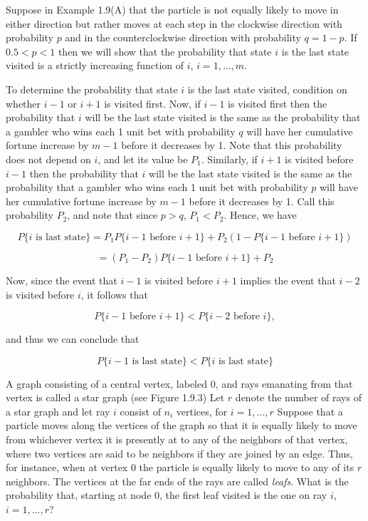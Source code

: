 \documentclass[lang=cn,10pt,thmcnt=section]{elegantbook}
\begin{document}
\begin{example}
	Suppose in Example 1.9(A) that the particle is not equally likely to move in either direction but rather moves at each step in the clockwise direction with probability $p$ and in the counterclockwise direction with probability $q = 1 - p$. If $0.5 < p < 1$ then we will show that the probability that state $i$ is the last state visited is a strictly increasing function of $i$, $i = 1, \ldots, m$.

To determine the probability that state $i$ is the last state visited, condition on whether $i - 1$ or $i + 1$ is visited first. Now, if $i - 1$ is visited first then the probability that $i$ will be the last state visited is the same as the probability that a gambler who wins each 1 unit bet with probability $q$ will have her cumulative fortune increase by $m - 1$ before it decreases by 1. Note that this probability does not depend on $i$, and let its value be $P_1$. Similarly, if $i + 1$ is visited before $i - 1$ then the probability that $i$ will be the last state visited is the same as the probability that a gambler who wins each 1 unit bet with probability $p$ will have her cumulative fortune increase by $m - 1$ before it decreases by 1. Call this probability $P_2$, and note that since $p > q$, $P_1 < P_2$. Hence, we have

\[
P\{i \text{ is last state}\} = P_1 P\{i - 1 \text{ before } i + 1\} + P_2 (1 - P\{i - 1 \text{ before } i + 1\})
\]

\[
= (P_1 - P_2) P\{i - 1 \text{ before } i + 1\} + P_2
\]

Now, since the event that $i - 1$ is visited before $i + 1$ implies the event that $i - 2$ is visited before $i$, it follows that

\[
P\{i - 1 \text{ before } i + 1\} < P\{i - 2 \text{ before } i\},
\]

and thus we can conclude that

\[
P\{i - 1 \text{ is last state}\} < P\{i \text{ is last state}\}
\]
\end{example}
\begin{example}
	\quad A graph consisting of a central vertex, labeled 0, and rays emanating from that vertex is called a star graph (see Figure 1.9.3) Let $r$ denote the number of rays of a star graph and let ray $i$ consist of $n_i$ vertices, for $i = 1, \ldots, r$ Suppose that a particle moves along the vertices of the graph so that it is equally likely to move from whichever vertex it is presently at to any of the neighbors of that vertex, where two vertices are said to be neighbors if they are joined by an edge. Thus, for instance, when at vertex 0 the particle is equally likely to move to any of its $r$ neighbors. The vertices at the far ends of the rays are called \textit{leafs}. What is the probability that, starting at node 0, the first leaf visited is the one on ray $i$, $i = 1, \ldots, r$?
\end{example}
\end{document}
